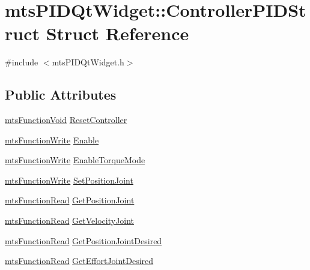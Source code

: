 \hypertarget{structmts_p_i_d_qt_widget_1_1_controller_p_i_d_struct}{}\section{mts\+P\+I\+D\+Qt\+Widget\+:\+:Controller\+P\+I\+D\+Struct Struct Reference}
\label{structmts_p_i_d_qt_widget_1_1_controller_p_i_d_struct}


{\ttfamily \#include $<$mts\+P\+I\+D\+Qt\+Widget.\+h$>$}

\subsection*{Public Attributes}
\begin{DoxyCompactItemize}
\item 
\hyperlink{classmts_function_void}{mts\+Function\+Void} \hyperlink{structmts_p_i_d_qt_widget_1_1_controller_p_i_d_struct_acc0f8f2adcb5819d0108d44c8d97f099}{Reset\+Controller}
\item 
\hyperlink{classmts_function_write}{mts\+Function\+Write} \hyperlink{structmts_p_i_d_qt_widget_1_1_controller_p_i_d_struct_a38d32885e2d0d48ed755d84d1a964ecc}{Enable}
\item 
\hyperlink{classmts_function_write}{mts\+Function\+Write} \hyperlink{structmts_p_i_d_qt_widget_1_1_controller_p_i_d_struct_a2dc1bec91e3de953ec4aa58722e082a9}{Enable\+Torque\+Mode}
\item 
\hyperlink{classmts_function_write}{mts\+Function\+Write} \hyperlink{structmts_p_i_d_qt_widget_1_1_controller_p_i_d_struct_a23f008fc730468d980666ac2dbc5dd00}{Set\+Position\+Joint}
\item 
\hyperlink{classmts_function_read}{mts\+Function\+Read} \hyperlink{structmts_p_i_d_qt_widget_1_1_controller_p_i_d_struct_ae03f2a8c890e912ab41519e44fdfbb0d}{Get\+Position\+Joint}
\item 
\hyperlink{classmts_function_read}{mts\+Function\+Read} \hyperlink{structmts_p_i_d_qt_widget_1_1_controller_p_i_d_struct_af2b243a2605efe3c82992dbc06cde0a2}{Get\+Velocity\+Joint}
\item 
\hyperlink{classmts_function_read}{mts\+Function\+Read} \hyperlink{structmts_p_i_d_qt_widget_1_1_controller_p_i_d_struct_a5b35f5db70ec3a0cb044eb9ac22578c9}{Get\+Position\+Joint\+Desired}
\item 
\hyperlink{classmts_function_read}{mts\+Function\+Read} \hyperlink{structmts_p_i_d_qt_widget_1_1_controller_p_i_d_struct_a8e7d5bd99d241f9286649ad4d6f83b02}{Get\+Effort\+Joint\+Desired}

\end{DoxyCompactItemize}
